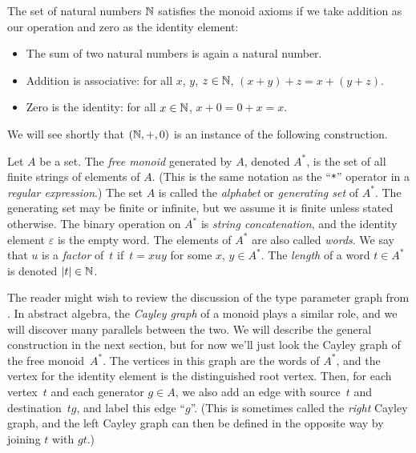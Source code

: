 \documentclass[../generics]{subfiles}
\begin{document}
\begin{example}
The set of natural numbers $\mathbb{N}$ satisfies the monoid axioms if we take addition as our operation and zero as the identity element:
\begin{itemize}
\item The sum of two natural numbers is again a natural number.
\item Addition is associative: for all $x$, $y$, $z\in\mathbb{N}$, $(x+y)+z=x+(y+z)$.
\item Zero is the identity: for all $x\in\mathbb{N}$, $x+0=0+x=x$.
\end{itemize}
\end{example}

We will see shortly that $(\mathbb{N},+,0)$ is an instance of the following construction.

\begin{definition}
Let $A$ be a set. The \emph{free monoid} generated by $A$, denoted $A^*$, is the set of all finite strings of elements of $A$. (This is the same notation as the ``\;\texttt{*}\;'' operator in a \emph{regular expression}.) The set $A$ is called the \emph{alphabet} or \emph{generating set} of $A^*$. The generating set may be finite or infinite, but we assume it is finite unless stated otherwise. The binary operation on $A^*$ is \emph{string concatenation}, and the identity element $\varepsilon$ is the empty word. The elements of $A^*$ are also called \emph{words}. We say that $u$ is a \emph{factor} of~$t$ if~$t=xuy$ for some $x$, $y\in A^*$. The \emph{length} of a word $t\in A^*$ is denoted $|t|\in\mathbb{N}$.
\end{definition}

The reader might wish to review the discussion of the type parameter graph from . In abstract algebra, the \emph{Cayley graph} of a monoid plays a similar role, and we will discover many parallels between the two. We will describe the general construction in the next section, but for now we'll just look the Cayley graph of the free monoid~$A^*$. The vertices in this graph are the words of $A^*$, and the vertex for the identity element is the distinguished root vertex. Then, for each vertex~$t$ and each generator $g\in A$, we also add an edge with source~$t$ and destination~$tg$, and label this edge ``$g$''. (This is sometimes called the \emph{right} Cayley graph, and the left Cayley graph can then be defined in the opposite way by joining $t$ with $gt$.)
\end{document}
